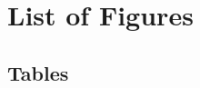 \chapter{List of Figures}

\makeatletter
{}
\makeatother

\section*{Tables}

\makeatletter
{}
\makeatother
